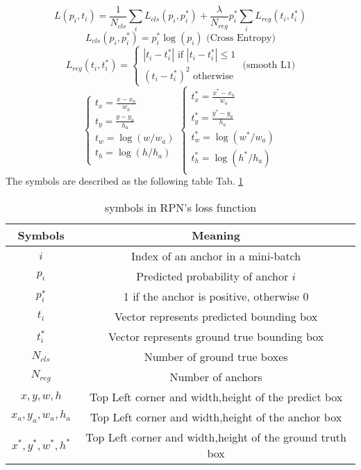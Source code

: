 \documentclass{IEEEtran}
\begin{document}
\begin{equation}
    L({p_i,t_i}) = \frac1{N_{cls}}\sum_iL_{cls}(p_i,p_i^*) + \frac\lambda{N_{reg}}p_i^*\sum_iL_{reg}(t_i,t_i^*)
\end{equation}
\begin{equation}
    L_{cls}(p_i,p_i^*) = p_i^*\log(p_i) \text{ (Cross Entropy)}
\end{equation}
\begin{equation}
    L_{reg}(t_i,t_i^*) = \begin{cases}
        |t_i - t_i^*|  \text{ if } |t_i - t_i^*| \le 1\\
        (t_i - t_i^*)^2 \text{ otherwise}
    \end{cases}
    \text{ (smooth L1)}
\end{equation}
\begin{equation}
    \begin{cases}
        t_x = \frac{x-x_a}{w_a}\\
        t_y = \frac{y-y_a}{h_a}\\
        t_w = \log(w / w_a) \\
        t_h = \log(h / h_a) \\
    \end{cases}
    \begin{cases}
        t_x^* = \frac{x^*-x_a}{w_a}\\
        t_y^* = \frac{y^*-y_a}{h_a}\\
        t_w^* = \log(w^* / w_a) \\
        t_h^* = \log(h^* / h_a) \\
    \end{cases}
\end{equation}
The symbols are described as the following table Tab. \ref{tableRPN}
\begin{table}[h]
    \centering\caption{symbols in RPN's loss function}\label{tableRPN}
       \begin{tabular}{cc}
        \toprule
        Symbols & Meaning \\
        \midrule
        $i$ & Index of an anchor in a mini-batch \\
        $p_i$ & Predicted probability of anchor $i$ \\
        $p^∗_i$ & 1 if the anchor is positive, otherwise 0\\
        $t_i$ & Vector represents predicted bounding box\\
        $t_i^*$ & Vector represents ground true bounding box\\
        $N_{cls}$ & Number of ground true boxes\\
        $N_{reg}$ & Number of anchors\\
        $x,y,w,h$ & Top Left corner and width,height of the predict box\\
        $x_a,y_a,w_a,h_a$ & Top Left corner and width,height of the anchor box\\
        $x^*,y^*,w^*,h^*$ & Top Left corner and width,height of the ground truth box\\
        \bottomrule
    \end{tabular}
\end{table}
\end{document}
